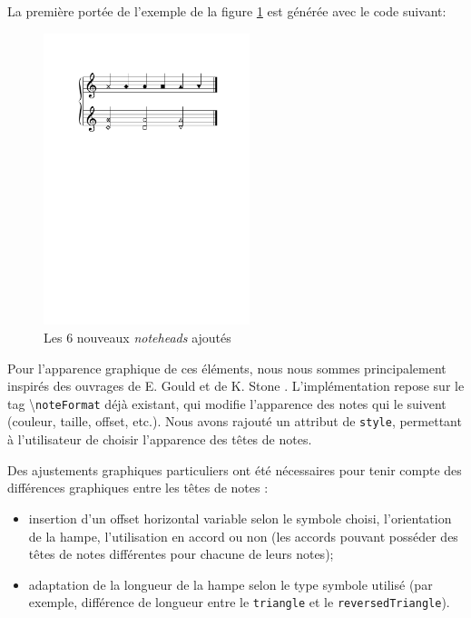 \documentclass{article}
\newenvironment{gmncode}	{\vspace{-2mm}\small\verbatim}{\endverbatim\vspace{-2mm}}
\newcommand{\code}[1]		{{\small \texttt{#1}}}
\newcommand{\guidotag}[1]	{\textbackslash\code{#1}}
\begin{document}
\vspace{2mm}
La première portée de l'exemple de la figure \ref{fig:noteheads} est générée avec le code suivant:
\begin{gmncode}
[
  \noteFormat<style="x"> a
  \noteFormat<style="diamond"> a
  \noteFormat<style="round"> a
  \noteFormat<style="square"> a
  \noteFormat<style="triangle"> a
  \noteFormat<style="reversedTriangle"> a
]
\end{gmncode}
%
\begin{figure}[h]
\centering
\includegraphics[width=6cm]{img/partitions/noteheads.pdf}
\caption{Les 6 nouveaux \emph{noteheads} ajoutés}
\label{fig:noteheads}
\end{figure}
%
\bigskip

Pour l'apparence graphique de ces éléments, nous nous sommes principalement inspirés des ouvrages de E. Gould \cite{gould2011behind} et de K. Stone \cite{stone1980music}.
L'implémentation repose sur le tag \guidotag{noteFormat} déjà existant, qui modifie l'apparence des notes qui le suivent (couleur, taille, offset, etc.). Nous avons rajouté un attribut de \code{style}, permettant à l'utilisateur de choisir l'apparence des têtes de notes.

Des ajustements graphiques particuliers ont été nécessaires pour tenir compte des différences graphiques entre les têtes de notes :
\begin{itemize}
    \item insertion d'un offset horizontal variable selon le symbole choisi, l'orientation de la hampe, l'utilisation en accord ou non (les accords pouvant posséder des têtes de notes différentes pour chacune de leurs notes);
    \item adaptation de la longueur de la hampe selon le type symbole utilisé (par exemple, différence de longueur entre le \code{triangle} et le \code{reversedTriangle}).
\end{itemize}
\end{document}
